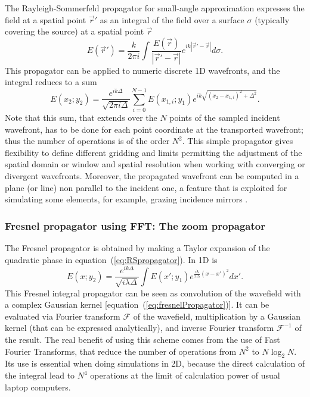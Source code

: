 \documentclass[preprint]{iucr}              %
\begin{document}
The Rayleigh-Sommerfeld propagator for small-angle approximation expresses the field at a spatial point $\vec{r}'$ as an integral of the field over a surface $\sigma$ (typically covering the source) at a spatial point $\vec{r}$ \cite{goodmanfourier}
\begin{equation}\label{eq:RSpropagator}
E(\vec{r}') =  \frac{k}{2 \pi i} \int \frac{E(\vec{r})}{|\vec{r}'-\vec{r}|} e^{ i k |\vec{r}' - \vec{r}|  }  d\sigma.
\end{equation}
This propagator can be applied to numeric discrete 1D wavefronts, and the integral reduces to a sum
\begin{equation}\label{eq:discreteRSpropagator}
E(x_2;y_2) = \frac{e^{i k \Delta}}{\sqrt{2 \pi i \Delta}}  \sum_{i=0}^{N-1}  E(x_{1,i};y_1) e^{i k \sqrt{(x_2 - x_{1,i})^2 + \Delta^2} }.
\end{equation}
Note that this sum, that extends over the $N$ points of the sampled incident wavefront, has to be done for each point coordinate at the transported wavefront; thus the number of operations is of the order $N^2$. This simple propagator gives flexibility to define different gridding and limits permitting the adjustment of the spatial domain or window and spatial resolution when working with converging or divergent wavefronts. Moreover, the propagated wavefront can be computed in a plane (or line) non parallel to the incident one, a feature that is exploited for simulating some elements, for example, grazing incidence mirrors \cite{WOFRYoptics}.


\subsubsection{Fresnel propagator using FFT: The zoom propagator}
\label{sec:zoomPropagator}


The Fresnel propagator is obtained by making a Taylor expansion of the quadratic phase in equation~(\ref{eq:RSpropagator}). In 1D is
\begin{equation}\label{eq:fresnelPropagator}
E(x;y_2) =  \frac{e^{i k \Delta}}{\sqrt{i \lambda \Delta}} \int E(x';y_1) e^{ \frac{i k}{2 \Delta}  (x-x')^2  }  dx'.
\end{equation}
This Fresnel integral propagator can be seen as convolution of the wavefield with a complex Gaussian kernel [equation~(\ref{eq:fresnelPropagator})].
It can be evaluated \cite{goodmanfourier} via Fourier transform $\mathcal{F}$ of the wavefield, multiplication by  a Gaussian kernel (that can be expressed analytically),  and inverse Fourier transform $\mathcal{F}^{-1}$ of the result.
The real benefit of using this scheme comes from the use of Fast Fourier Transforms, that reduce the number of operations from $N^2$ to $N \log_2 N$. Its use is essential when doing simulations in 2D, because the direct calculation of the integral lead to $N^4$ operations at the limit of calculation power of usual laptop computers.
\end{document}
